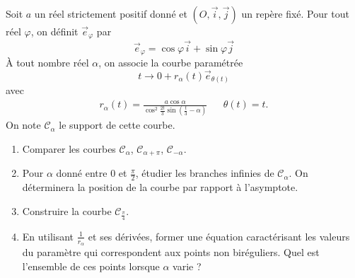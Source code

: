 Soit $a$ un r{\'e}el strictement positif donn{\'e} et $(O,\overrightarrow i,\overrightarrow j)$ un repère fixé.\newline
Pour tout réel $\varphi$, on définit $\overrightarrow e_{\varphi}$ par
\begin{displaymath}
 \overrightarrow e_\varphi = \cos\varphi \overrightarrow i + \sin\varphi \overrightarrow j
\end{displaymath}
\`A tout nombre r{\'e}el $\alpha $, on associe la courbe paramétrée
\begin{displaymath}
 t \rightarrow 0 + r_\alpha(t)\overrightarrow e_{\theta(t)}
\end{displaymath}
avec
\begin{align*}
r_\alpha(t)=\frac{a\cos \alpha }{\cos ^2\frac{2t}3\sin (\frac t3-\alpha)}
& & \theta (t)=t. 
\end{align*}
On note $\mathcal C_\alpha$ le support de cette courbe.
\begin{enumerate}
\item  Comparer les courbes $\mathcal{C}_{\alpha }$, $\mathcal{C}_{\alpha+\pi }$, $\mathcal{C}_{-\alpha }$.

\item  Pour $\alpha $ donn{\'e} entre 0 et $\frac{\pi }{2}$, {\'e}tudier les branches infinies de $\mathcal{C}_{\alpha }$. On d{\'e}terminera la position de la courbe par rapport {\`a} l'asymptote.

\item  Construire la courbe $\mathcal{C}_{\frac{\pi }{4}}$.

\item  En utilisant $\frac{1}{r_\alpha}$ et ses d{\'e}riv{\'e}es, former une {\'e}quation caract{\'e}risant les valeurs du param{\`e}tre qui correspondent aux points non bir{\'e}guliers.\newline
Quel est l'ensemble de ces points lorsque $\alpha $ varie ?
\end{enumerate}
